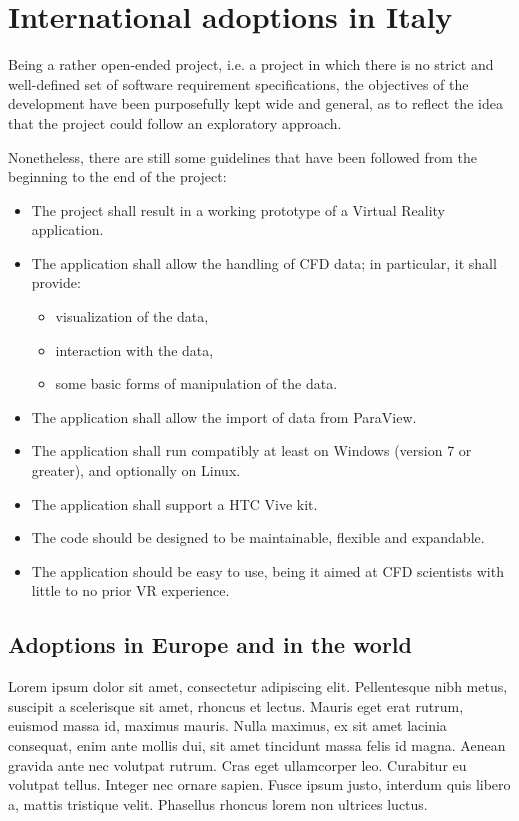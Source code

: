 \section{International adoptions in Italy}\label{sec:adoptionsinitaly}
Being a rather open-ended project, i.e. a project in which there is no strict and well-defined set of software requirement specifications, the objectives of the development have been purposefully kept wide and general, as to reflect the idea that the project could follow an exploratory approach.

Nonetheless, there are still some guidelines that have been followed from the beginning to the end of the project:

\begin{itemize}
	\item The project shall result in a working prototype of a Virtual Reality application.
	\item The application shall allow the handling of CFD data; in particular, it shall provide:
	\begin{itemize}
		\item visualization of the data,
		\item interaction with the data,
		\item some basic forms of manipulation of the data.
	\end{itemize}
	\item The application shall allow the import of data from ParaView.
	\item The application shall run compatibly at least on Windows (version 7 or greater), and optionally on Linux.
	\item The application shall support a HTC Vive kit.
	\item The code should be designed to be maintainable, flexible and expandable.
	\item The application should be easy to use, being it aimed at CFD scientists with little to no prior VR experience.
\end{itemize}

\subsection{Adoptions in Europe and in the world}\label{sec:adoptionsineurope}
Lorem ipsum dolor sit amet, consectetur adipiscing elit. Pellentesque nibh metus, suscipit a scelerisque sit amet, rhoncus et lectus. Mauris eget erat rutrum, euismod massa id, maximus mauris. Nulla maximus, ex sit amet lacinia consequat, enim ante mollis dui, sit amet tincidunt massa felis id magna. Aenean gravida ante nec volutpat rutrum. Cras eget ullamcorper leo. Curabitur eu volutpat tellus. Integer nec ornare sapien. Fusce ipsum justo, interdum quis libero a, mattis tristique velit. Phasellus rhoncus lorem non ultrices luctus.

